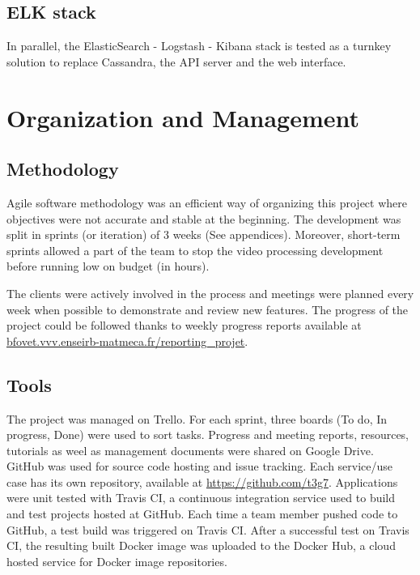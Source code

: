 \documentclass[11pt]{article}
\begin{document}
\subsection{ELK stack}

In parallel, the ElasticSearch - Logstash - Kibana stack is tested as a turnkey solution to replace Cassandra, the API server and the web interface. %

\section{Organization and Management}

\subsection{Methodology}

Agile software methodology was an efficient way of organizing this project where objectives were not accurate and stable at the beginning. The development was split in sprints (or iteration) of 3 weeks (See appendices).
Moreover, short-term sprints allowed a part of the team to stop the video processing development before running low on budget (in hours).

The clients were actively involved in the process and meetings were planned every week when possible to demonstrate and review new features. The progress of the project could be followed thanks to weekly progress reports available at \url{bfovet.vvv.enseirb-matmeca.fr/reporting_projet}.

\subsection{Tools}

The project was managed on Trello. For each sprint, three boards (To do, In progress, Done) were used to sort tasks.
Progress and meeting reports, resources, tutorials as weel as management documents were shared on Google Drive.
GitHub was used for source code hosting and issue tracking. Each service/use case has its own repository, available at \url{https://github.com/t3g7}.
Applications were unit tested with Travis CI, a continuous integration service used to build and test projects hosted at GitHub. Each time a team member pushed code to GitHub, a test build was triggered on Travis CI.
After a successful test on Travis CI, the resulting built Docker image was uploaded to the Docker Hub, a cloud hosted service for Docker image repositories.
\end{document}
